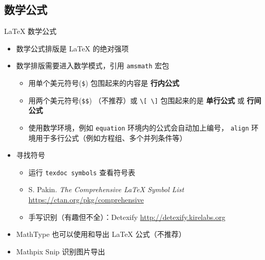    \subsection{数学公式}
    \begin{frame}[fragile]{\LaTeX{} 数学公式}
        \begin{itemize}
        \item 数学公式排版是 \LaTeX{} 的绝对强项
        \item 数学排版需要进入数学模式，引用 \texttt{amsmath} 宏包
            \begin{itemize}
            \item 用单个美元符号(\verb|$|) 包围起来的内容是 {\bf 行内公式}
          \item 用两个美元符号(\verb|$$|) （不推荐）或 \verb|\[ \]| 包围起来的是 {\bf 单行公式} 或 {\bf 行间公式}
            \item 使用数学环境，例如 \texttt{equation} 环境内的公式会自动加上编号，
                \texttt{align} 环境用于多行公式（例如方程组、多个并列条件等）
          \end{itemize}
        \item 寻找符号
            \begin{itemize}
              \item 运行 \texttt{texdoc symbols} 查看符号表
              \item S. Pakin. \emph{The Comprehensive \LaTeX{} Symbol List}
                    \url{https://ctan.org/pkg/comprehensive}
              \item 手写识别（有趣但不全）：Detexify \url{http://detexify.kirelabs.org}
            \end{itemize}
        \item MathType 也可以使用和导出 \LaTeX{} 公式（不推荐）
        \item Mathpix Snip 识别图片导出
        \end{itemize}
        \end{frame}
    
